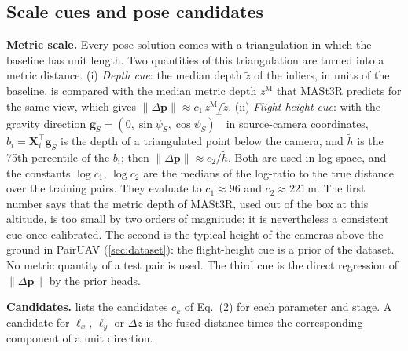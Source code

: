 \documentclass[10pt,twocolumn,letterpaper]{article}
\newcommand{\dpv}{\Delta\mathbf{p}}
\begin{document}
\subsection{Scale cues and pose candidates}
\label{sec:cands}

\noindent\textbf{Metric scale.} Every pose solution comes with a triangulation in which the baseline has unit length. Two quantities of this triangulation are turned into a metric distance. (i) \emph{Depth cue}: the median depth $\tilde z$ of the inliers, in units of the baseline, is compared with the median metric depth $z^{\mathrm{M}}$ that MASt3R predicts for the same view, which gives $\|\dpv\|\approx c_1\,z^{\mathrm{M}}/\tilde z$. (ii) \emph{Flight-height cue}: with the gravity direction $\mathbf{g}_S=(0,\sin\psi_S,\cos\psi_S)^{\!\top}$ in source-camera coordinates, $b_i=\mathbf{X}_i^{\!\top}\mathbf{g}_S$ is the depth of a triangulated point below the camera, and $\tilde h$ is the 75th percentile of the $b_i$; then $\|\dpv\|\approx c_2/\tilde h$. Both are used in log space, and the constants $\log c_1$, $\log c_2$ are the medians of the log-ratio to the true distance over the training pairs. They evaluate to $c_1\approx 96$ and $c_2\approx 221$\,m. The first number says that the metric depth of MASt3R, used out of the box at this altitude, is too small by two orders of magnitude; it is nevertheless a consistent cue once calibrated. The second is the typical height of the cameras above the ground in PairUAV (\cref{sec:dataset}): the flight-height cue is a prior of the dataset. No metric quantity of a test pair is used. The third cue is the direct regression of $\|\dpv\|$ by the prior heads.

\noindent\textbf{Candidates.}  lists the candidates $c_k$ of Eq.~(2) for each parameter and stage. A candidate for $\ell_x$, $\ell_y$ or $\Delta z$ is the fused distance times the corresponding component of a unit direction.
\end{document}
